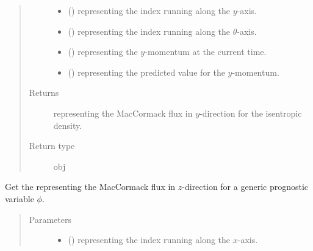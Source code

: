 \documentclass[letterpaper,10pt,english]{sphinxmanual}
\begin{document}
\begin{fulllineitems}
\begin{fulllineitems}
\begin{quote}
\begin{description}
\begin{itemize}
\item {} 
 () \textendash{}  representing the index running along the \(y\)-axis.

\item {} 
 () \textendash{}  representing the index running along the \(\theta\)-axis.

\item {} 
 () \textendash{}  representing the \(y\)-momentum at the current time.

\item {} 
 () \textendash{}  representing the predicted value for the \(y\)-momentum.

\end{itemize}

\item[{Returns}] \leavevmode
{} representing the MacCormack flux in \(y\)-direction for the isentropic density.

\item[{Return type}] \leavevmode
obj

\end{description}\end{quote}

\end{fulllineitems}


\begin{fulllineitems}
\label{\detokenize{api:dycore.flux_isentropic_maccormack.FluxIsentropicMacCormack._get_maccormack_flux_z}}
Get the  representing the MacCormack flux in \(z\)-direction for a
generic prognostic variable \(\phi\).
\begin{quote}\begin{description}
\item[{Parameters}] \leavevmode\begin{itemize}
\item {} 
 () \textendash{}  representing the index running along the \(x\)-axis.


\end{itemize}
\end{description}
\end{quote}
\end{fulllineitems}
\end{fulllineitems}
\end{document}
